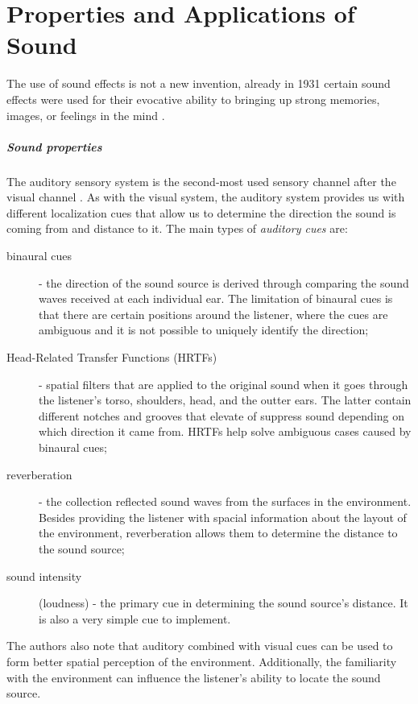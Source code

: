 \chapter{Properties and Applications of Sound}

The use of sound effects is not a new invention, already in 1931 certain sound effects were used for their evocative ability to bringing up strong memories, images, or feelings in the mind \cite{bbc_yearbook_1931}.


\paragraph[]{Sound properties} 
The auditory sensory system is the second-most used sensory channel after the visual channel \cite[p.~46]{jr_3d_2017}. As with the visual system, the auditory system provides us with different localization cues that allow us to determine the direction the sound is coming from and distance to it. The main types of \textit{auditory cues }are:
\begin{description}
	\item[binaural cues] - the direction of the sound source is derived through comparing the sound waves received at each individual ear. The limitation of binaural cues is that there are certain positions around the listener, where the cues are ambiguous and it is not possible to uniquely identify the direction;
	\item[Head-Related Transfer Functions (HRTFs)] - spatial filters that are applied to the original sound when it goes through the listener's torso, shoulders, head, and the outter ears. The latter contain different notches and grooves that elevate of suppress sound depending on which direction it came from. HRTFs help solve ambiguous cases caused by binaural cues;
	\item[reverberation] - the collection reflected sound waves from the surfaces in the environment. Besides providing the listener with spacial information about the layout of the environment, reverberation allows them to determine the distance to the sound source;
	\item[sound intensity] (loudness) - the primary cue in determining the sound source's distance. It is also a very simple cue to implement.
\end{description}
The authors also note that auditory combined with visual cues can be used to form better spatial perception of the environment. Additionally, the familiarity with the environment can influence the listener's ability to locate the sound source.

